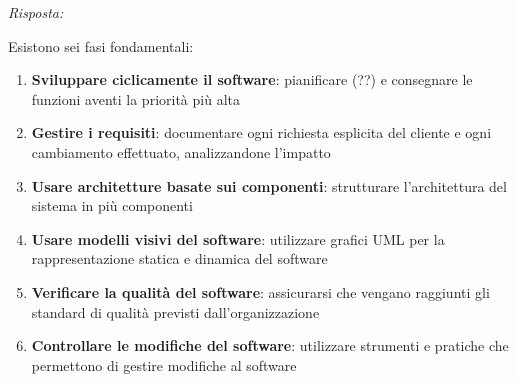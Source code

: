 \documentclass{article}
\newenvironment{solution}
    {\textit{Risposta:}}
    {}
\begin{document}
\begin{solution}
\begin{itemize}
	\newline
	Esistono sei fasi fondamentali:
	\begin{enumerate}
		\item \textbf{Sviluppare ciclicamente il software}: pianificare (??) e consegnare le funzioni aventi la priorità più alta
		\item \textbf{Gestire i requisiti}: documentare ogni richiesta esplicita del cliente e ogni cambiamento effettuato, analizzandone l'impatto
		\item \textbf{Usare architetture basate sui componenti}: strutturare l'architettura del sistema in più componenti
		\item \textbf{Usare modelli visivi del software}: utilizzare grafici UML per la rappresentazione statica e dinamica del software
		\item \textbf{Verificare la qualità del software}: assicurarsi che vengano raggiunti gli standard di qualità previsti dall'organizzazione
		\item \textbf{Controllare le modifiche del software}: utilizzare strumenti e pratiche che permettono di gestire modifiche al software
	\end{enumerate}
\end{itemize}

\end{solution}
\end{document}
